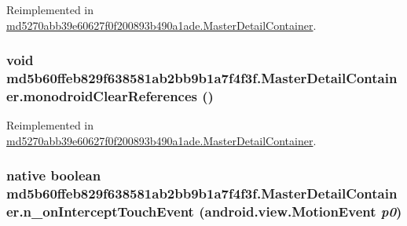 Reimplemented in \hyperlink{classmd5270abb39e60627f0f200893b490a1ade_1_1_master_detail_container_31845d67e73cb6060fb8228c0a40c8d4}{md5270abb39e60627f0f200893b490a1ade.MasterDetailContainer}.\hypertarget{classmd5b60ffeb829f638581ab2bb9b1a7f4f3f_1_1_master_detail_container_4bbf2f5847044e80a0b1b8e54eb8f621}{
\subsubsection[{monodroidClearReferences}]{\setlength{\rightskip}{0pt plus 5cm}void md5b60ffeb829f638581ab2bb9b1a7f4f3f.MasterDetailContainer.monodroidClearReferences ()}}
\label{classmd5b60ffeb829f638581ab2bb9b1a7f4f3f_1_1_master_detail_container_4bbf2f5847044e80a0b1b8e54eb8f621}




Reimplemented in \hyperlink{classmd5270abb39e60627f0f200893b490a1ade_1_1_master_detail_container_93a5d443fda3e43f134d2522b7230b21}{md5270abb39e60627f0f200893b490a1ade.MasterDetailContainer}.\hypertarget{classmd5b60ffeb829f638581ab2bb9b1a7f4f3f_1_1_master_detail_container_843262038a60f2af2bbb4c867c0a0641}{
\subsubsection[{n\_\-onInterceptTouchEvent}]{\setlength{\rightskip}{0pt plus 5cm}native boolean md5b60ffeb829f638581ab2bb9b1a7f4f3f.MasterDetailContainer.n\_\-onInterceptTouchEvent (android.view.MotionEvent {\em p0})}}
\label{classmd5b60ffeb829f638581ab2bb9b1a7f4f3f_1_1_master_detail_container_843262038a60f2af2bbb4c867c0a0641}


